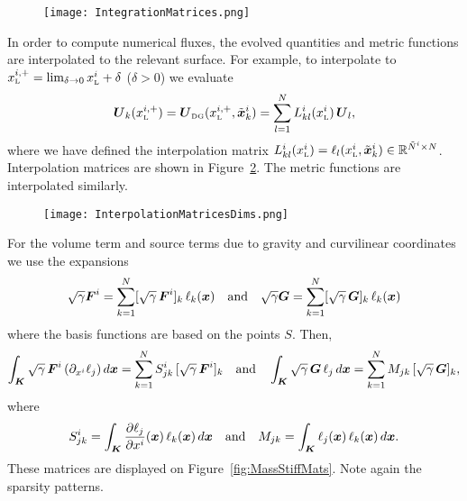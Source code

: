 \documentclass[10pt,preprint]{aastex}
\begin{document}
\begin{figure}[h]
  \begin{center}
     \texttt{[image: IntegrationMatrices.png]}
  \end{center}
  \caption{}
  \label{fig:SurfMassMats}
\end{figure}

In order to compute numerical fluxes, the evolved quantities and metric functions are interpolated to the relevant surface.  
For example, to interpolate to $x_{\Low}^{i,+}=\lim_{\delta\to0}x_{\Low}^{i}+\delta$ ($\delta>0$) we evaluate
\begin{equation}
  \bU_{k}(x_{\Low}^{i,+})
  =\bU_{\DG}(x_{\Low}^{i,+},\tilde{\bx}_{k}^{i})
  =\sum_{l=1}^{N}L_{kl}^{i}(x_{\Low}^{i})\,\bU_{l},
\end{equation}
where we have defined the interpolation matrix $L_{kl}^{i}(x_{\Low}^{i})=\ell_{l}(x_{\Low}^{i},\tilde{\bx}_{k}^{i})\in\bbR^{\tilde{N}^{i}\times N}$.  
Interpolation matrices are shown in Figure~\ref{fig:IntMatsDims}.  
The metric functions are interpolated similarly.  

\begin{figure}[h]
  \begin{center}
     \texttt{[image: InterpolationMatricesDims.png]}
  \end{center}
  \caption{}
  \label{fig:IntMatsDims}
\end{figure}

For the volume term and source terms due to gravity and curvilinear coordinates we use the expansions
\begin{equation}
  \sqrt{\gamma}\bF^{i}=\sum_{k=1}^{N}[\sqrt{\gamma}\,\bF^{i}]_{k}\,\ell_{k}(\bx)
  \quad\text{and}\quad
  \sqrt{\gamma}\bG=\sum_{k=1}^{N}[\sqrt{\gamma}\,\bG]_{k}\,\ell_{k}(\bx)
\end{equation}
where the basis functions are based on the points $S$.  
Then, 
\begin{equation}
  \int_{\bK}\sqrt{\gamma}\,\bF^{i}\,(\pd{\ell_{j}}{x^{i}})\,d\bx
  =\sum_{k=1}^{N}S_{jk}^{i}\,[\sqrt{\gamma}\,\bF^{i}]_{k}
  \quad\text{and}\quad
  \int_{\bK}\sqrt{\gamma}\,\bG\,\ell_{j}\,d\bx
  =\sum_{k=1}^{N}M_{jk}\,[\sqrt{\gamma}\,\bG]_{k},
\end{equation}
where
\begin{equation}
  S_{jk}^{i}=\int_{\bK}\pderiv{\ell_{j}}{x^{i}}(\bx)\,\ell_{k}(\bx)\,d\bx
  \quad\text{and}\quad
  M_{jk}
  =\int_{\bK}\ell_{j}(\bx)\,\ell_{k}(\bx)\,d\bx.
\end{equation}
These matrices are displayed on Figure~\ref{fig:MassStiffMats}.  
Note again the sparsity patterns.  
\end{document}
